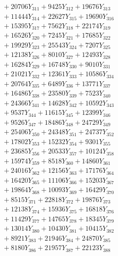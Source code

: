 \documentclass[a4paper,10pt]{article}
\begin{document}
{\begin{align}
&\;  + 20706 Y_{311} + 9425 Y_{312} + 19676 Y_{313} \\[0.3ex]
&\;  + 11444 Y_{314} + 22627 Y_{315} + 19690 Y_{316} \\[0.3ex]
&\;  + 15395 Y_{317} + 7562 Y_{318} + 22174 Y_{319} \\[0.3ex]
&\;  + 16526 Y_{320} + 7245 Y_{321} + 17685 Y_{322} \\[0.3ex]
&\;  + 19929 Y_{323} + 25543 Y_{324} + 7207 Y_{325} \\[0.3ex]
&\;  + 12138 Y_{326} + 8010 Y_{327} + 12493 Y_{328} \\[0.5ex]\allowbreak
&\;  + 16284 Y_{329} + 16748 Y_{330} + 9010 Y_{331} \\[0.3ex]
&\;  + 21021 Y_{332} + 12361 Y_{333} + 10586 Y_{334} \\[0.3ex]
&\;  + 20764 Y_{335} + 6489 Y_{336} + 13771 Y_{337} \\[0.3ex]
&\;  + 16486 Y_{338} + 23580 Y_{339} + 7523 Y_{340} \\[0.3ex]
&\;  + 24366 Y_{341} + 14628 Y_{342} + 10592 Y_{343} \\[0.3ex]
&\;  + 9537 Y_{344} + 11615 Y_{345} + 12399 Y_{346} \\[0.3ex]
&\;  + 9526 Y_{347} + 18486 Y_{348} + 24729 Y_{349} \\[0.3ex]
&\;  + 25406 Y_{350} + 24348 Y_{351} + 24737 Y_{352} \\[0.3ex]
&\;  + 17802 Y_{353} + 15232 Y_{354} + 9301 Y_{355} \\[0.3ex]
&\;  + 23685 Y_{356} + 20533 Y_{357} + 10124 Y_{358} \\[0.5ex]\allowbreak
&\;  + 15974 Y_{359} + 8518 Y_{360} + 14860 Y_{361} \\[0.3ex]
&\;  + 24016 Y_{362} + 12156 Y_{363} + 17176 Y_{364} \\[0.3ex]
&\;  + 16420 Y_{365} + 11106 Y_{366} + 15203 Y_{367} \\[0.3ex]
&\;  + 19864 Y_{368} + 10093 Y_{369} + 16429 Y_{370} \\[0.3ex]
&\;  + 8515 Y_{371} + 22818 Y_{372} + 19876 Y_{373} \\[0.3ex]
&\;  + 12138 Y_{374} + 15936 Y_{375} + 16818 Y_{376} \\[0.3ex]
&\;  + 11429 Y_{377} + 14765 Y_{378} + 18345 Y_{379} \\[0.3ex]
&\;  + 13014 Y_{380} + 10430 Y_{381} + 10415 Y_{382} \\[0.3ex]
&\;  + 8921 Y_{383} + 21946 Y_{384} + 24870 Y_{385} \\[0.3ex]
&\;  + 8180 Y_{386} + 21957 Y_{387} + 22123 Y_{388} \\[0.5ex]\allowbreak

\end{align}}
\end{document}
